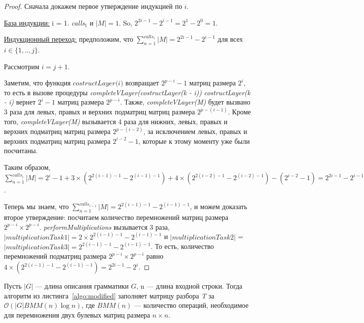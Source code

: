 \documentclass[14pt]{matmex-diploma-custom}
\begin{document}
\begin{proof}

Сначала докажем первое утверждение индукцией по $i$.

\underline{База индукции:} i = 1. \textit{calls$_{1}$} и $|M| = 1$. So, $2^{2i - 1} - 2^{i - 1} = 2^1 - 2^0 = 1$.

\underline{Индукционный переход:} предположим, что $\sum_{n=1}^{calls_i}{|M|} = 2^{2i - 1} - 2^{i - 1}$ для всех $i \in \{ 1, .., j\}$.

Рассмотрим $i = j + 1$.

Заметим, что функция $\textit{costructLayer(i)}$ возвращает $2^{p - i} - 1$ матриц размера $2^i$, то есть в вызове процедуры \textit{completeVLayer(costructLayer(k - i))}  \textit{costructLayer(k - i)} вернет $2^i - 1$ матриц размера $2^{p - i}$. 
Также, \textit{completeVLayer(M)} будет вызвано 3 раза для левых, правых и верхних подматриц матриц размера $2^{p - (i - 1)}$. Кроме того, \textit{completeVLayer(M)} вызывается 4 раза для нижних, левых, правых и верхних подматриц матриц размера $2^{p - (i - 2)}$, за исключением левых, правых и верхних подматриц матриц размера $2^{i - 2} - 1$, которые к этому моменту уже были посчитаны.

Таким образом, $\sum_{n=1}^{calls_i}{|M|} = 2^{i} - 1 + 3 \times (2^{2(i - 1) - 1} - 2^{(i - 1) - 1}) + 4 \times (2^{2(i - 2) - 1} - 2^{(i - 2) - 1}) - (2^{i - 2} - 1) = 2^{2i - 1} - 2^{i - 1}$.

Теперь мы знаем, что $\sum_{n=1}^{calls_{i-1}}{|M|} = 2^{2(i - 1) - 1} - 2^{(i - 1) - 1}$, и можем доказать второе утверждение: посчитаем количество перемножений матриц размера $2^{p - i} \times 2^{p - i}$. 
\textit{performMultiplications} вызывается 3 раза, $|multiplicationTask1| = 2 \times 2^{2(i - 1) - 1} - 2^{(i - 1) - 1}$ и $|multiplicationTask2|$ = $|multiplicationTask3| = 2^{2(i - 1) - 1} - 2^{(i - 1) - 1}$. То есть, количество перемножений подматриц размера $2^{p - i} \times 2^{p - i}$ равно $ 4 \times (2^{2(i - 1) - 1} - 2^{(i - 1) - 1}) = 2^{2i - 1} - 2^{i}$.
\end{proof}

\begin{theorem}
Пусть $|G|$ --- длина описания грамматики $G$, n --- длина входной строки. Тогда алгоритм из листинга~\ref{algo:modified} заполняет матрицу разбора \textit{T} за $\mathcal{O}(|G|BMM(n)\log{n})$, где $BMM(n)$ --- количество операций, необходимое для перемножения двух булевых матриц размера $n \times n$.
\end{theorem}
\end{document}
